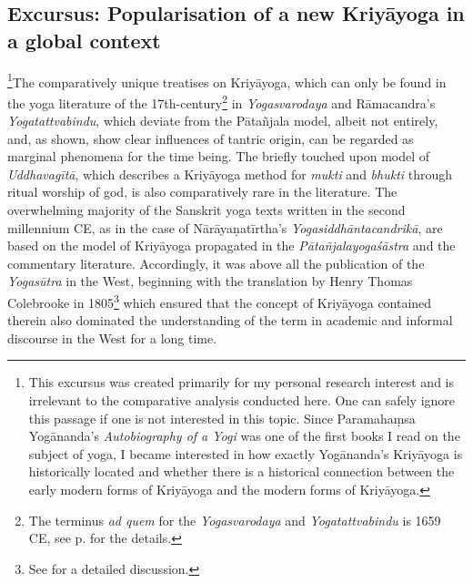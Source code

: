 \subsection{Excursus: Popularisation of a new Kriyāyoga in a global context}
\label{excursus}
\footnote{This excursus was created primarily for my personal research interest and is irrelevant to the comparative analysis conducted here. One can safely ignore this passage if one is not interested in this topic. Since Paramahaṃsa Yogānanda's \textit{Autobiography of a Yogi} was one of the first books I read on the subject of yoga, I became interested in how exactly Yogānanda's Kriyāyoga is historically located and whether there is a historical connection between the early modern forms of Kriyāyoga and the modern forms of Kriyāyoga.}The comparatively unique treatises on Kriyāyoga, which can only be found in the yoga literature of the 17th-century\footnote{The terminus \textit{ad quem} for the \textit{Yogasvarodaya} and \textit{Yogatattvabindu} is 1659 CE, see p.\pageref{dating} for the details.} in \textit{Yogasvarodaya} and Rāmacandra's \textit{Yogatattvabindu}, which deviate from the Pātañjala model, albeit not entirely, and, as shown, show clear influences of tantric origin, can be regarded as marginal phenomena for the time being. The briefly touched upon model of \textit{Uddhavagītā}, which describes a Kriyāyoga method for \textit{mukti} and \textit{bhukti} through ritual worship of god, is also comparatively rare in the literature. The overwhelming majority of the Sanskrit yoga texts written in the second millennium CE, as in the case of Nārāyaṇatīrtha's \textit{Yogasiddhāntacandrikā}, are based on the model of Kriyāyoga propagated in the \textit{Pātañjalayogaśāstra} and the commentary literature. Accordingly, it was above all the publication of the \textit{Yogasūtra} in the West, beginning with the translation by Henry Thomas Colebrooke in 1805\footnote{See \cite{colebrooke2014} for a detailed discussion.} which ensured that the concept of Kriyāyoga contained therein also dominated the understanding of the term in academic and informal discourse in the West for a long time. 

